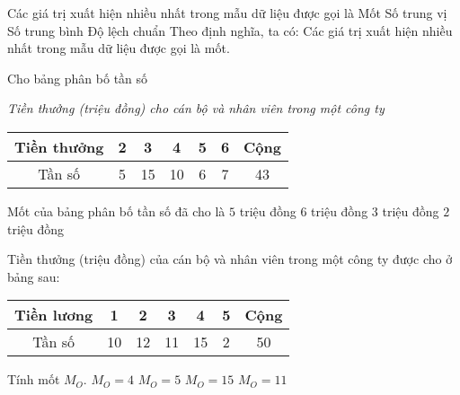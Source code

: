 \begin{ex}%
	Các giá trị xuất hiện nhiều nhất trong mẫu dữ liệu được gọi là
	\choice
	{\True Mốt}
	{Số trung vị}
	{Số trung bình}
	{Độ lệch chuẩn}
	\loigiai
	{
		Theo định nghĩa, ta có: Các giá trị xuất hiện nhiều nhất trong mẫu dữ liệu được gọi là mốt.
	}
\end{ex}
\begin{ex}%
	Cho bảng phân bố tần số\\
	\centerline{\it Tiền thưởng (triệu đồng) cho cán bộ và nhân viên trong một công ty}
	\begin{center}
		\begin{tabular}{|c|c|c|c|c|c|c|}
			\hline 
			Tiền thưởng & 2 & 3 & 4 & 5 & 6 & Cộng\\ 
			\hline 
			Tần số & 5 & 15 & 10 & 6 & 7 & 43\\ 
			\hline 
		\end{tabular} 
	\end{center}
	Mốt của bảng phân bố tần số đã cho là
	\choice
	{$5$ triệu đồng}
	{$6$ triệu đồng}
	{\True $3$ triệu đồng}
	{$2$ triệu đồng}
\end{ex}

\begin{ex}%
	Tiền thưởng (triệu đồng) của cán bộ và nhân viên trong một công ty được cho ở bảng sau:
	\begin{center}
		\begin{tabular}{|c|c|c|c|c|c|c|}
			\hline 
			Tiền lương	&1	&2	&3	&4	&5	&Cộng\\
			\hline 
			Tần số	&10	&12	&11	&15	&2	&50 \\
			\hline 
		\end{tabular}
	\end{center}
	Tính mốt $M_O.$
	\choice
	{\True $M_O=4$}
	{$M_O=5$}
	{$M_O=15$}
	{$M_O=11$}
\end{ex}




